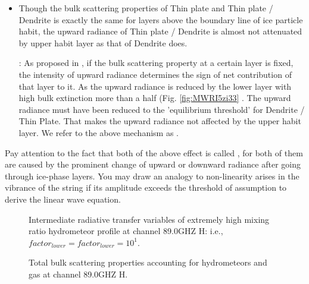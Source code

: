 \begin{itemize}
    \item {}
    Though the bulk scattering properties of Thin plate and Thin plate / Dendrite is exactly the same for layers above the
boundary line of ice particle habit, the upward radiance of Thin plate / Dendrite is almost not attenuated by upper habit layer
as that of Dendrite does. 

    : As proposed in , if the bulk scattering property at a certain layer is fixed, the intensity
of upward radiance determines the sign of net contribution of that layer to it. As the upward radiance is reduced by the lower layer
with high bulk extinction more than a half (Fig. \ref{fig:MWRI5zi33} . The upward radiance must have 
been reduced to the 'equilibrium threshold' for Dendrite / Thin Plate.
That makes the upward radiance not affected by the upper habit layer.
We refer to the above mechanism as .
\end{itemize}

Pay attention to the fact that both of the above effect is called , for both of them are caused by the prominent
change of upward or downward radiance after going through ice-phase layers. You may draw an analogy to non-linearity arises in  
the vibrance of the string if its amplitude exceeds the threshold of assumption to derive the linear wave equation.

\begin{figure}[hbtp] 
\centering
{}
\caption{Intermediate radiative transfer variables of extremely high mixing ratio hydrometeor profile
at channel 89.0GHZ H:
i.e., $factor_{lower} = factor_{lower} = 10^{1}$.}
\label{fig:MWRI5zi44}
\end{figure}

\begin{figure}[hbtp] 
\centering
{}
\caption{Total bulk scattering properties accounting for hydrometeors and gas at channel 89.0GHZ H.}
\label{fig:MWRI5ABSP}
\end{figure}

